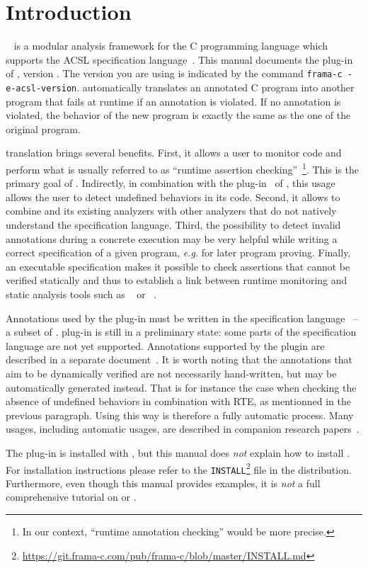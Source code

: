 \chapter{Introduction}

\framac~\cite{userman,fac15} is a modular analysis framework for the C
programming language which supports the ACSL specification
language~\cite{acsl}. This manual documents the \eacsl plug-in of \framac,
version \eacslpluginversion. The \eacsl version you are using is indicated by the
command \texttt{frama-c -e-acsl-version}. \eacsl
automatically translates an annotated C program into another program that fails
at runtime if an annotation is violated. If no annotation is violated, the
behavior of the new program is exactly the same as the one of the original
program.

\eacsl translation brings several benefits. First, it allows a user to monitor
\C code and perform what is usually referred to as ``runtime assertion
checking''~\cite{runtime-assertion-checking}\footnote{In our context, ``runtime
  annotation checking'' would be more precise.}. This is the primary goal of
\eacsl. Indirectly, in combination with the \rte plug-in~\cite{rte} of \framac,
this
usage allows the user to detect undefined behaviors in its \C code. Second, it
allows to combine \framac and its existing analyzers with other \C analyzers
that do not natively understand the \acsl specification language. Third, the
possibility to detect invalid annotations during a concrete execution may be
very helpful while writing a correct specification of a given program,
\emph{e.g.} for later program proving.  Finally, an executable specification
makes it possible to check assertions that cannot be verified statically and
thus to establish a link between runtime monitoring and static analysis tools
such as \Eva~\cite{eva} or \wpplugin~\cite{wp}.

Annotations used by the plug-in must be written in the \eacsl specification
language~\cite{eacsl,sac13} -- a subset of \acsl. \eacsl plug-in is still in a
preliminary state: some parts of the \eacsl specification language are not yet
supported. Annotations supported by the plugin are described in a separate
document~\cite{eacsl-implem}. It is worth noting that the annotations that aim
to be dynamically verified are not necessarily hand-written, but may be
automatically generated instead. That is for instance the case when checking the
absence of undefined behaviors in combination with RTE, as mentionned in the
previous paragraph. Using \eacsl this way is therefore a fully automatic
process. Many usages, including automatic usages, are described in companion
research papers~\cite{rv13tutorial,rvcubes17tool,signoles18hdr}.

The \eacsl plug-in is installed with \framac, but this manual does \emph{not}
explain how to install \framac.  For installation instructions please refer to
the \texttt{INSTALL}\footnote{
  \url{https://git.frama-c.com/pub/frama-c/blob/master/INSTALL.md}}
file in the \framac distribution.  Furthermore, even though
this manual provides examples, it is \emph{not} a full comprehensive tutorial on
\framac or \eacsl.
